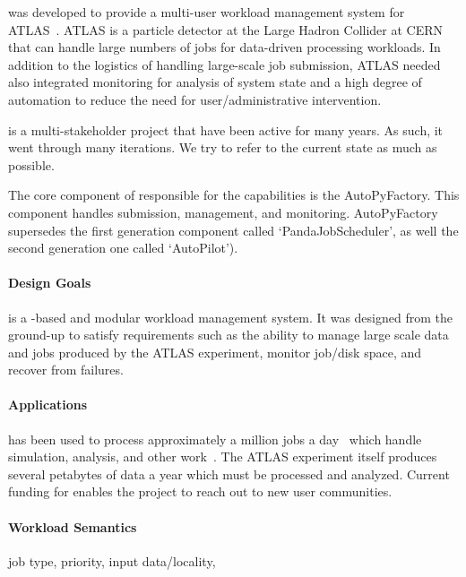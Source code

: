 \documentclass{sig-alternate}
\begin{document}
\panda {} was developed to provide a multi-user workload
management system for ATLAS~\cite{aad2008atlas}. ATLAS is a particle detector
at the Large Hadron Collider at CERN that can handle large numbers of jobs for
data-driven processing workloads. In addition to the logistics of handling
large-scale job submission, ATLAS needed also integrated monitoring for
analysis of system state and a high degree of automation to reduce the need for
user/administrative intervention.

\panda is a multi-stakeholder project that have been active for many years. As
such, it went through many iterations. We try to refer to the current state as
much as possible.

The core component of \panda responsible for the \pilot capabilities is the
AutoPyFactory\cite{Caballero:2012ka}. This component handles \pilot submission,
management, and monitoring. AutoPyFactory supersedes the first generation
component called `PandaJobScheduler', as well the second generation one called
`AutoPilot').

\paragraph{Design Goals}

\panda is a \pilot-based and modular workload management system. It was
designed from the ground-up to satisfy requirements such as the ability to
manage large scale data and jobs produced by the ATLAS experiment, monitor
job/disk space, and recover from failures.

\paragraph{Applications}

\panda has been used to process approximately
a million jobs a day~\cite{pandapresentation2013-06} which handle simulation,
analysis, and other work~\cite{maeno_pd2p:_2012}. The ATLAS experiment itself
produces several petabytes of data a year which must be processed and analyzed.
Current funding for \panda enables the project to reach out to new user
communities.

\paragraph{Workload Semantics}

job type, priority, input data/locality,
\end{document}
